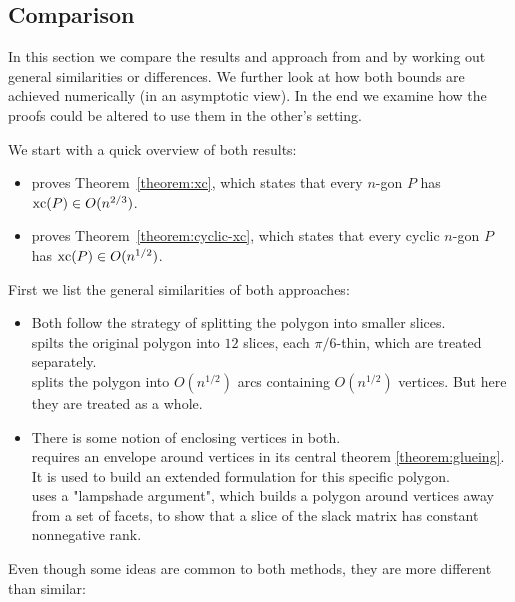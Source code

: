 \subsection{Comparison}

In this section we compare the results and approach from \cite{shitov2020sublinear} and \cite{kwan2020extension} by working out general similarities or differences. We further look at how both bounds are achieved numerically (in an asymptotic view). In the end we examine how the proofs could be altered to use them in the other's setting.

We start with a quick overview of both results:

\begin{itemize}
  \item \cite{shitov2020sublinear} proves Theorem~\ref{theorem:xc}, which states that every $n$-gon $P$ has $\operatorname{xc}(P) \in O(n^{2/3})$.
  \item \cite{kwan2020extension} proves Theorem~\ref{theorem:cyclic-xc}, which states that every cyclic $n$-gon $P$ has $\operatorname{xc}(P) \in O(n^{1/2})$.
\end{itemize}

First we list the general similarities of both approaches:

\begin{itemize}
  \item Both follow the strategy of splitting the polygon into smaller slices.\\
  \cite{shitov2020sublinear} spilts the original polygon into $12$ slices, each $\pi/6$-thin, which are treated separately.\\
  \cite{kwan2020extension} splits the polygon into $O(n^{1/2})$ arcs containing $O(n^{1/2})$ vertices. But here they are treated as a whole.

  \item There is some notion of enclosing vertices in both.\\
  \cite{shitov2020sublinear} requires an envelope around vertices in its central theorem \ref{theorem:glueing}. It is used to build an extended formulation for this specific polygon.\\
  \cite{kwan2020extension} uses a "lampshade argument", which builds a polygon around vertices away from a set of facets, to show that a slice of the slack matrix has constant nonnegative rank.
\end{itemize}

Even though some ideas are common to both methods, they are more different than similar:

